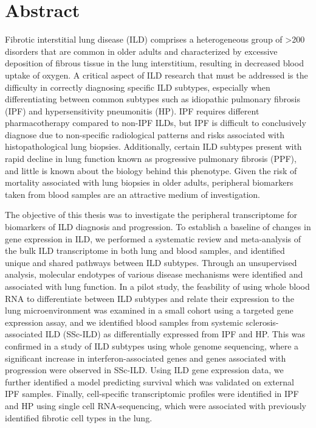 \documentclass[
]{article}
\begin{document}
\setlength{\parindent}{4em} 
\linespread{1}
\doublespacing

\section*{Abstract}

Fibrotic interstitial lung disease (ILD) comprises a heterogeneous group of \textgreater200 disorders that are common in older adults and characterized by excessive deposition of fibrous tissue in the lung interstitium, resulting in decreased blood uptake of oxygen. A critical aspect of ILD research that must be addressed is the difficulty in correctly diagnosing specific ILD subtypes, especially when differentiating between common subtypes such as idiopathic pulmonary fibrosis (IPF) and hypersensitivity pneumonitis (HP). IPF requires different pharmacotherapy compared to non-IPF ILDs, but IPF is difficult to conclusively diagnose due to non-specific radiological patterns and risks associated with histopathological lung biopsies. Additionally, certain ILD subtypes present with rapid decline in lung function known as progressive pulmonary fibrosis (PPF), and little is known about the biology behind this phenotype. Given the risk of mortality associated with lung biopsies in older adults, peripheral biomarkers taken from blood samples are an attractive medium of investigation.

The objective of this thesis was to investigate the peripheral transcriptome for biomarkers of ILD diagnosis and progression. To establish a baseline of changes in gene expression in ILD, we performed a systematic review and meta-analysis of the bulk ILD transcriptome in both lung and blood samples, and identified unique and shared pathways between ILD subtypes. Through an unsupervised analysis, molecular endotypes of various disease mechanisms were identified and associated with lung function. In a pilot study, the feasbility of using whole blood RNA to differentiate between ILD subtypes and relate their expression to the lung microenvironment was examined in a small cohort using a targeted gene expression assay, and we identified blood samples from systemic sclerosis-associated ILD (SSc-ILD) as differentially expressed from IPF and HP. This was confirmed in a study of ILD subtypes using whole genome sequencing, where a significant increase in interferon-associated genes and genes associated with progression were observed in SSc-ILD. Using ILD gene expression data, we further identified a model predicting survival which was validated on external IPF samples. Finally, cell-specific transcriptomic profiles were identified in IPF and HP using single cell RNA-sequencing, which were associated with previously identified fibrotic cell types in the lung.
\end{document}
